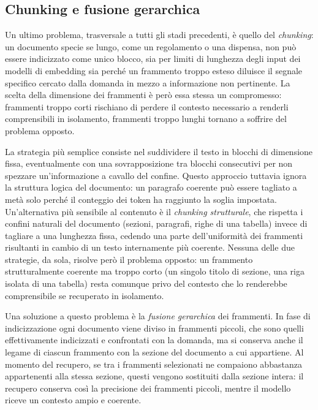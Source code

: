 \subsection{Chunking e fusione gerarchica}

Un ultimo problema, trasversale a tutti gli stadi precedenti, è quello del \emph{chunking}: un documento specie se lungo, come un regolamento o una dispensa, non può essere indicizzato come unico blocco, sia per limiti di
lunghezza degli input dei modelli di embedding sia perché un frammento troppo esteso diluisce il segnale specifico
cercato dalla domanda in mezzo a informazione non pertinente. La scelta della dimensione dei frammenti è però essa
stessa un compromesso: frammenti troppo corti rischiano di perdere il contesto necessario a renderli comprensibili
in isolamento, frammenti troppo lunghi tornano a soffrire del problema opposto.

La strategia più semplice consiste nel suddividere il testo in blocchi di dimensione fissa, eventualmente con una
sovrapposizione tra blocchi consecutivi per non spezzare un'informazione a cavallo del confine. Questo approccio tuttavia ignora la
struttura logica del documento: un paragrafo coerente può essere tagliato a metà solo perché il conteggio dei token ha raggiunto la soglia impostata. Un'alternativa più sensibile al contenuto è il \emph{chunking strutturale}, che rispetta i confini naturali del documento (sezioni, paragrafi, righe di una tabella) invece di tagliare a una lunghezza fissa, cedendo una parte dell'uniformità dei frammenti risultanti in cambio di un testo internamente più coerente. Nessuna delle due strategie, da sola, risolve però il problema opposto: un frammento strutturalmente coerente ma troppo corto (un singolo titolo di sezione, una riga isolata di una tabella) resta comunque privo del contesto che lo renderebbe comprensibile se recuperato in isolamento.

Una soluzione a questo problema è la \emph{fusione gerarchica} dei frammenti. In fase di
indicizzazione ogni documento viene diviso in frammenti piccoli, che sono quelli effettivamente
indicizzati e confrontati con la domanda, ma si conserva anche il legame di ciascun frammento con
la sezione del documento a cui appartiene. Al momento del recupero, se tra i frammenti selezionati
ne compaiono abbastanza appartenenti alla stessa sezione, questi vengono sostituiti dalla sezione
intera: il recupero conserva così la precisione dei frammenti piccoli, mentre il modello riceve un
contesto ampio e coerente.
